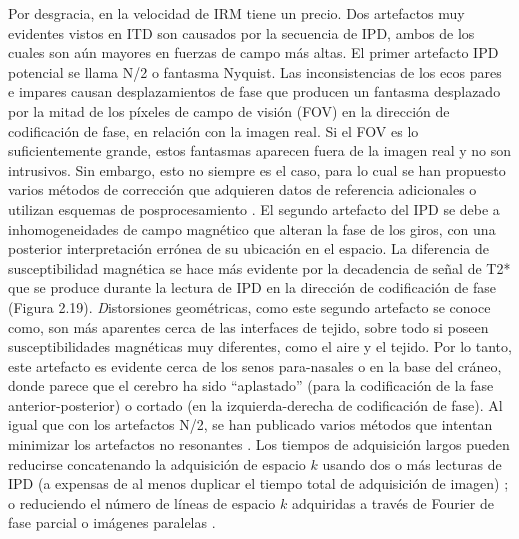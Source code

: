 Por desgracia, en la velocidad de IRM tiene un precio. Dos artefactos muy evidentes vistos en ITD son causados por la secuencia de IPD, ambos de los cuales son aún mayores en fuerzas de campo más altas. El primer artefacto IPD potencial se llama N/2 o fantasma Nyquist. Las inconsistencias de los ecos pares e impares causan desplazamientos de fase que producen un fantasma desplazado por la mitad de los píxeles de campo de visión (FOV) en la dirección de codificación de fase, en relación con la imagen real. Si el FOV es lo suficientemente grande, estos fantasmas aparecen fuera de la imagen real y no son intrusivos. Sin embargo, esto no siempre es el caso, para lo cual se han propuesto varios métodos de corrección que adquieren datos de referencia adicionales \cite{Hu_1996,kuei_2004} o utilizan esquemas de posprocesamiento \cite{kuei_2004,Zhang_2004}. El segundo artefacto del IPD se debe a inhomogeneidades de campo magnético que alteran la fase de los giros, con una posterior interpretación errónea de su ubicación en el espacio. La diferencia de susceptibilidad magnética se hace más evidente por la decadencia de señal de T2* que se produce durante la lectura de IPD en la dirección de codificación de fase (Figura 2.19). {\emph Distorsiones geométricas}, como este segundo artefacto se conoce como, son más aparentes cerca de las interfaces de tejido, sobre todo si poseen susceptibilidades magnéticas muy diferentes, como el aire y el tejido. Por lo tanto, este artefacto es evidente cerca de los senos para-nasales o en la base del cráneo, donde parece que el cerebro ha sido ``aplastado'' (para la codificación de la fase anterior-posterior) o cortado (en la izquierda-derecha de codificación de fase). Al igual que con los artefactos N/2, se han publicado varios métodos que intentan minimizar los artefactos no resonantes \cite{Weiskopf_2005,Jezzard_1995,Reber_1998}. Los tiempos de adquisición largos pueden reducirse concatenando la adquisición de espacio $k$ usando dos o más lecturas de IPD (a expensas de al menos duplicar el tiempo total de adquisición de imagen) \cite{99,100}; o reduciendo el número de líneas de espacio $k$ adquiridas a través de Fourier de fase parcial o imágenes paralelas \cite{Pruessmann_1999}.

